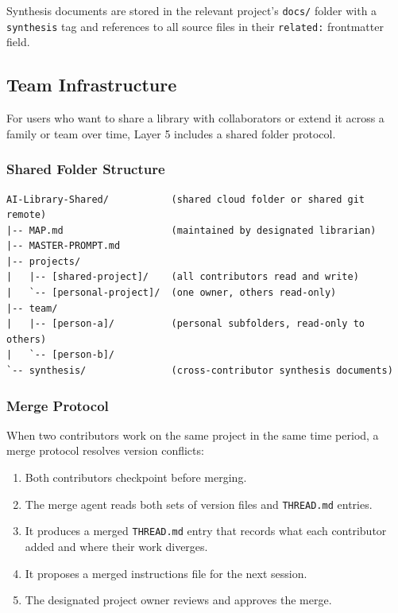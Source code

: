 \documentclass[12pt,letterpaper]{article}
\begin{document}
Synthesis documents are stored in the relevant project's \texttt{docs/}
folder with a \texttt{synthesis} tag and references to all source files
in their \texttt{related:} frontmatter field.

\subsection{Team Infrastructure}

For users who want to share a library with collaborators or extend it
across a family or team over time, Layer 5 includes a shared folder
protocol.

\subsubsection{Shared Folder Structure}

\begin{lstlisting}
AI-Library-Shared/           (shared cloud folder or shared git remote)
|-- MAP.md                   (maintained by designated librarian)
|-- MASTER-PROMPT.md
|-- projects/
|   |-- [shared-project]/    (all contributors read and write)
|   `-- [personal-project]/  (one owner, others read-only)
|-- team/
|   |-- [person-a]/          (personal subfolders, read-only to others)
|   `-- [person-b]/
`-- synthesis/               (cross-contributor synthesis documents)
\end{lstlisting}

\subsubsection{Merge Protocol}

When two contributors work on the same project in the same time period,
a merge protocol resolves version conflicts:

\begin{enumerate}
  \item Both contributors checkpoint before merging.
  \item The merge agent reads both sets of version files and
        \texttt{THREAD.md} entries.
  \item It produces a merged \texttt{THREAD.md} entry that records
        what each contributor added and where their work diverges.
  \item It proposes a merged instructions file for the next session.
  \item The designated project owner reviews and approves the merge.
\end{enumerate}
\end{document}
